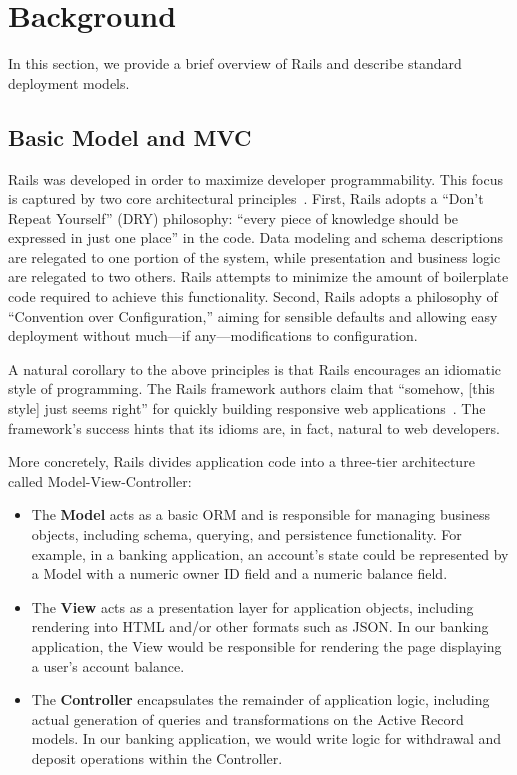 
\section{Background}
\label{sec:motivation}

In this section, we provide a brief overview of Rails and describe standard deployment models.

\subsection{Basic Model and MVC}

Rails was developed in order to maximize developer programmability. This focus is captured by two core architectural principles~\cite{rails-book}. First, Rails adopts a ``Don't Repeat Yourself'' (DRY) philosophy: ``every piece of knowledge should be expressed in just one place'' in the code. Data modeling and schema descriptions are relegated to one portion of the system, while presentation and business logic are relegated to two others. Rails attempts to minimize the amount of boilerplate code required to achieve this functionality. Second, Rails adopts a philosophy of ``Convention over Configuration,'' aiming for sensible defaults and allowing easy deployment without much---if any---modifications to configuration.

A natural corollary to the above principles is that Rails encourages an idiomatic style of programming. The Rails framework authors claim that ``somehow, [this style] just seems right'' for quickly building responsive web applications~\cite{rails-book}. The framework's success hints that its idioms are, in fact, natural to web developers.

More concretely, Rails divides application code into a three-tier architecture called Model-View-Controller:

\begin{itemize}
\item The \textbf{Model} acts as a basic ORM and is responsible for managing business objects, including schema, querying, and persistence functionality. For example, in a banking application, an account's state could be represented by a Model with a numeric owner ID field and a numeric balance field.

\item The \textbf{View} acts as a presentation layer for application objects, including rendering into HTML and/or other formats such as JSON. In our banking application, the View would be responsible for rendering the page displaying a user's account balance.

\item The \textbf{Controller} encapsulates the remainder of application logic, including actual generation of queries and transformations on the Active Record models. In our banking application, we would write logic for withdrawal and deposit operations within the Controller.
\end{itemize}

